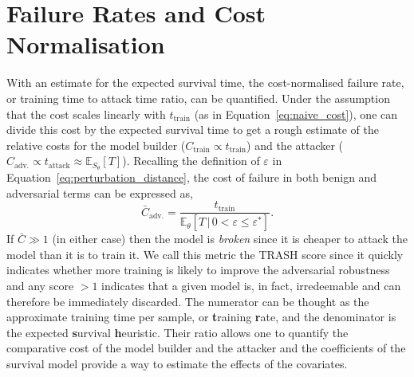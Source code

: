 


\section{Failure Rates and Cost Normalisation}
\label{cost_normalization}

With an estimate for the expected survival time, the cost-normalised failure rate, or training time to attack time ratio, can be quantified. Under the assumption that the cost scales linearly with $t_{\mathrm{train}}$ (as in Equation~\ref{eq:naive_cost}), one can divide this cost by the expected survival time to get a rough estimate of the relative costs for the model builder ($C_{\mathrm{train}} \propto t_{\mathrm{train}}$) and the attacker ($C_{\mathrm{adv.}} \propto t_{\mathrm{attack}} \approx \mathbb{E}_{S_\theta}[T]$). Recalling the definition of $\varepsilon$ in Equation~\ref{eq:perturbation_distance}, the cost of failure in both benign and adversarial terms can be expressed as,
\begin{equation}
	\bar{C}_{\mathrm{adv.}}=\frac{t_{\mathrm{train}}}{\mathbb{E}_{\theta}[T \,|\, 0 < \varepsilon \leq \varepsilon^*]}.
	\label{eq:cost}
\end{equation}
If $\bar{C} \gg 1$ (in either case) then the model is \textit{broken} since it is cheaper to attack the model than it is to train it.
We call this metric the TRASH score since it quickly indicates whether more training is likely to improve the adversarial robustness and any score $ > 1$ indicates that a given model is, in fact, irredeemable and can therefore be immediately discarded. The numerator can be thought as the approximate training time per sample, or \textbf{t}raining \textbf{r}ate, and the denominator is the expected \textbf{s}urvival \textbf{h}euristic. Their ratio allows one to quantify the comparative cost of the model builder and the attacker and the coefficients of the survival model provide a way to estimate the effects of the covariates.


